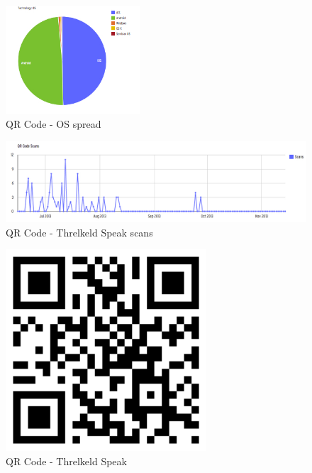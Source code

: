 \documentclass[a4paper,12pt]{article}
\begin{document}
\begin{figure}[ht!]
	\centering
	\includegraphics[width=50mm]{./images/OSAccess}
	\caption{QR Code - OS spread}
	\label{QR-OS-access}
\end{figure}

\begin{figure}[ht!]
	\centering
	\includegraphics[width=150mm]{./images/threkeld-scans}
	\caption{QR Code - Threlkeld Speak scans}
	\label{QR-threkeld}
\end{figure}

\begin{figure}[ht!]
	\centering
	\includegraphics[width=75mm]{./images/qrcode-threlkeld}
	\caption{QR Code - Threlkeld Speak}
	\label{QR-threkeld-barcode}
\end{figure}
\end{document}
